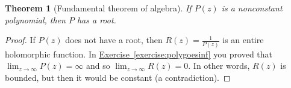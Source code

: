\documentclass[12pt,openany]{book}
\newcommand{\sabs}[1]{\lvert {#1} \rvert}
\newcommand{\abs}[1]{\left\lvert {#1} \right\rvert}
\theoremstyle{plain}
\newtheorem{thm}{Theorem}[section]
\theoremstyle{remark}
\theoremstyle{definition}
\theoremstyle{exercise}
\theoremstyle{example}
\newcommand{\exerciseref}[1]{\hyperref[#1]{Exercise~\ref*{#1}}}
\begin{document}
\begin{thm}[Fundamental theorem of algebra]
If $P(z)$ is a nonconstant polynomial, then $P$ has a root.
\end{thm}

\begin{proof}
If $P(z)$ does not have a root, then $R(z) = \frac{1}{P(z)}$ is
an entire holomorphic function.
In \exerciseref{exercise:polygoesinf} you proved that
$\lim_{z \to \infty} P(z) = \infty$ and so
$\lim_{z \to \infty} R(z) = 0$.  In other words, $R(z)$ is bounded, but then
it would be constant (a contradiction).
%
%
\end{proof}
\end{document}
